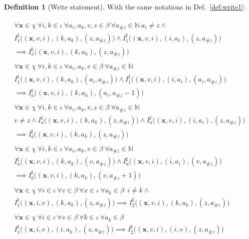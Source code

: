 \documentclass[a4paper]{article}
\newcommand{\ve}[1]{\mathbf{#1}}
\newcommand{\vx}{\ve{x}}
\newcommand{\NN}{\mathbb{N}}
\newcommand{\abstr}[1]{#1^\sharp}
\newcommand{\hash}{\#}
\theoremstyle{definition}
\newtheorem{definition}{Definition}
\theoremstyle{plain}
\newcommand{\rulespacing}{\\[0.4em]}
\begin{document}
\begin{definition}[Write statement]\label{def:write1_count}
With the same notations in Def.~\ref{def:write1}:

{\small\begin{align*}
\begin{aligned}
\forall \vx \in \chi~ \forall i,k \in \iota~ \forall a_i,a_k,v,z \in \beta~
\forall a_{\hash z}\in \NN~ a_i \neq z  \land \\
\abstr{I}_1\big((\vx, v, i), (k, a_k), (z, a_{\hash z})\big) \land
\abstr{I}_1\big((\vx, v, i), (i, a_i), (z, a_{\hash z})\big) \\ \implies
\abstr{I}_a\big((\vx, v, i), (k, a_k), (z, a_{\hash z})\big)
\end{aligned}\rulespacing
\begin{aligned}
\forall \vx \in \chi~ \forall i,k \in \iota~ \forall a_i,a_k,v \in \beta~
\forall a_{\hash z}\in \NN \\
\abstr{I}_1\big((\vx, v, i), (k, a_k), (a_i, a_{\hash z})\big) \land
\abstr{I}_1\big((\vx, v, i), (i, a_i), (a_i, a_{\hash z})\big) \\ \implies
\abstr{I}_a\big((\vx, v, i), (k, a_k), (a_i, a_{\hash z}-1)\big)
\end{aligned}\rulespacing
\begin{aligned}
\forall \vx \in \chi~ \forall i,k \in \iota~ \forall a_i,a_k,v,z \in \beta~
\forall a_{\hash z}\in \NN \\ v \neq z \land
\abstr{I}_a\big((\vx, v, i), (k, a_k), (z, a_{\hash z})\big) \land
\abstr{I}_a\big((\vx, v, i), (i, a_i), (z, a_{\hash z})\big) \\ \implies
\abstr{I}_b\big((\vx, v, i), (k, a_k), (z, a_{\hash z})\big)
\end{aligned}\rulespacing
\begin{aligned}
\forall \vx \in \chi~ \forall i,k \in \iota~ \forall a_i,a_k,v \in \beta~
\forall a_{\hash z}\in \NN \\
\abstr{I}_a\big((\vx, v, i), (k, a_k), (v, a_{\hash z})\big) \land
\abstr{I}_a\big((\vx, v, i), (i, a_i), (v, a_{\hash z})\big) \\ \implies
\abstr{I}_b\big((\vx, v, i), (k, a_k), (v, a_{\hash z}+1)\big)
\end{aligned}\rulespacing
\begin{aligned}
\forall \vx \in \chi~ \forall i \in \iota~ \forall v \in \beta~
  \forall x \in \iota~ \forall a_k \in \beta~~  i\neq k \land \\
  \abstr{I}_1\big((\vx,i,v),(k,a_k), (z, a_{\hash z})\big)
  \implies
  \abstr{I}_2\big((\vx,v,i),(k,a_k), (z, a_{\hash z})\big)
\end{aligned}\rulespacing
\begin{aligned}
\forall \vx \in \chi~ \forall i \in \iota~ \forall v \in \beta~
  \forall k \in \iota~ \forall a_k \in \beta\\
  \abstr{I}_1\big((\vx,i,v),(i,a_k), (z, a_{\hash z})\big)  \implies
  \abstr{I}_2\big((\vx,v,i),(i,v), (z, a_{\hash z})\big)
\end{aligned}
\end{align*}}
\end{definition}
\end{document}
